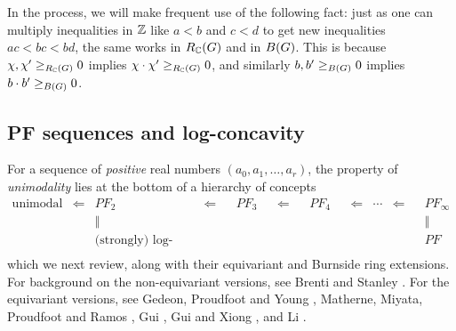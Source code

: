 \begin{comment}
\begin{example} \rm
We saw that the unimodality inequality \eqref{unimodality} 
$a_k \leq_\Z a_{k+1}$ lifts to the inequality $A_\R^k \leq_{R_\C(\subgroup)} A_\R^{k+1}$ in Corollary~\ref{AHK-equivariant-Hard-Lefschetz}, which lifts to the inequality $[\FY^k] \leq_{B(\subgroup)} [\FY^{k+1}]$ in Theorem~\ref{main-theorem}(ii).
\end{example}

\end{comment}

In the process, we will make frequent use of the following fact:  just as one can multiply inequalities in $\mathbb{Z}$ like $a< b$ and $c < d$ to get new inequalities $ac < bc < bd$, the same works in $R_{\mathbb{C}}(G)$
and in $B(G)$.  This is because
 $\chi, \chi' \geq_{R_{\mathbb{C}}(G)} 0$ implies $\chi \cdot \chi' \geq_{R_{\mathbb{C}}(G)} 0$, and similarly
$b, b' \geq_{B(G)} 0$ implies $b \cdot b' \geq_{B(G)} 0$.

\subsection{PF sequences and log-concavity}
For a sequence of {\it positive} real numbers $(a_0,a_1,\ldots,a_r)$, the property of {\it unimodality} lies at the bottom of a hierarchy of concepts
\begin{equation}
\label{PF-hierarchy}
\begin{array}{rccccccccccccccc}
\text{unimodal}
&\Leftarrow&
PF_2
&\Leftarrow&
&PF_3&
&\Leftarrow&
&PF_4&
&\Leftarrow&
\cdots&
\Leftarrow&
&PF_\infty\\
&  & \Vert & & & &
& & & & & & & &
&\Vert\\
&  & \text{(strongly) log-concave} & & & &
& & & & & & & &
&PF\\
\end{array}
\end{equation}
which we next review, along with their equivariant and Burnside ring extensions.  For background on the non-equivariant versions, see Brenti \cite{Brenti} and Stanley \cite{Stanley-log-concavity}.  For the equivariant versions, see Gedeon, Proudfoot and Young \cite{GPY},
Matherne, Miyata, Proudfoot and Ramos \cite{MMPR}, Gui \cite{Gui2022}, Gui and Xiong \cite{GuiXiong}, and Li \cite{Li2022}.

